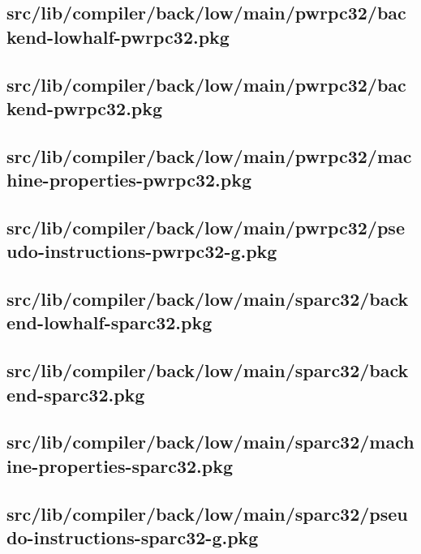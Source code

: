 \subsection{src/lib/compiler/back/low/main/pwrpc32/backend-lowhalf-pwrpc32.pkg}


\subsection{src/lib/compiler/back/low/main/pwrpc32/backend-pwrpc32.pkg}


\subsection{src/lib/compiler/back/low/main/pwrpc32/machine-properties-pwrpc32.pkg}


\subsection{src/lib/compiler/back/low/main/pwrpc32/pseudo-instructions-pwrpc32-g.pkg}


\subsection{src/lib/compiler/back/low/main/sparc32/backend-lowhalf-sparc32.pkg}


\subsection{src/lib/compiler/back/low/main/sparc32/backend-sparc32.pkg}


\subsection{src/lib/compiler/back/low/main/sparc32/machine-properties-sparc32.pkg}


\subsection{src/lib/compiler/back/low/main/sparc32/pseudo-instructions-sparc32-g.pkg}


